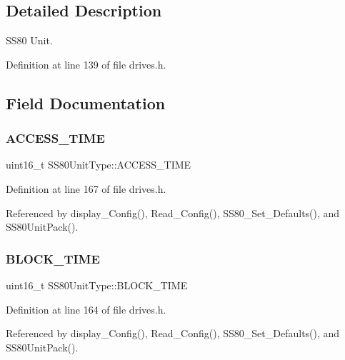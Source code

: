 \subsection{Detailed Description}
S\+S80 Unit. 

Definition at line 139 of file drives.\+h.



\subsection{Field Documentation}
\mbox{\label{structSS80UnitType_ab43ef110f145d428fff831afc18f5e24}} 
\subsubsection{\texorpdfstring{A\+C\+C\+E\+S\+S\+\_\+\+T\+I\+ME}{ACCESS\_TIME}}
{\footnotesize\ttfamily uint16\+\_\+t S\+S80\+Unit\+Type\+::\+A\+C\+C\+E\+S\+S\+\_\+\+T\+I\+ME}



Definition at line 167 of file drives.\+h.



Referenced by display\+\_\+\+Config(), Read\+\_\+\+Config(), S\+S80\+\_\+\+Set\+\_\+\+Defaults(), and S\+S80\+Unit\+Pack().

\mbox{\label{structSS80UnitType_ab94c4b75c74e08e128d4802f5dec0dd5}} 
\subsubsection{\texorpdfstring{B\+L\+O\+C\+K\+\_\+\+T\+I\+ME}{BLOCK\_TIME}}
{\footnotesize\ttfamily uint16\+\_\+t S\+S80\+Unit\+Type\+::\+B\+L\+O\+C\+K\+\_\+\+T\+I\+ME}



Definition at line 164 of file drives.\+h.



Referenced by display\+\_\+\+Config(), Read\+\_\+\+Config(), S\+S80\+\_\+\+Set\+\_\+\+Defaults(), and S\+S80\+Unit\+Pack().


